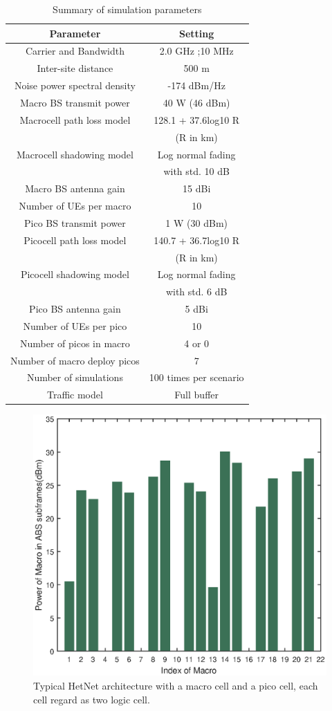 \documentclass[journal]{IEEETran}
\begin{document}
\begin{table}[!t]
\renewcommand{\arraystretch}{1.3}
\caption{Summary of simulation parameters}\label{T_SimulationParameters}
\centering
\begin{tabular}{c||c}
\hline
\bfseries Parameter & \bfseries Setting\\
\hline\hline
Carrier and Bandwidth &    2.0 GHz ;10 MHz\\
\hline
Inter-site distance  &    500 m\\
\hline
Noise power spectral density    &  -174 dBm/Hz\\
\hline
Macro BS transmit power&  40 W (46 dBm)\\
\hline
Macrocell path loss model&    128.1 + 37.6log10 R \\
&(R in km)\\
\hline
Macrocell shadowing model&    Log normal fading \\
&with std. 10 dB\\
\hline
Macro BS antenna gain   &   15 dBi\\
\hline
Number of UEs per macro & 10\\
\hline
Pico BS transmit power    &  1 W (30 dBm)\\
\hline
Picocell path loss model   &   140.7 + 36.7log10 R \\
&(R in km)\\
\hline
Picocell shadowing model &   Log normal fading\\
&with std. 6 dB\\
\hline
Pico BS antenna gain &  5 dBi\\
\hline
Number of UEs per pico  &    10\\
\hline
Number of picos in macro  &    4 or 0\\
\hline
Number of macro deploy picos  &    7\\
\hline
Number of simulations &    100 times per scenario \\
\hline
Traffic model  &   Full buffer \\
\hline
\end{tabular}
\end{table}

\begin{figure}[htpb]
\centering
\includegraphics[width=.5\textwidth]{PowerOfMacro.eps}
\caption{Typical HetNet architecture with a macro cell and a pico cell, each cell regard as two logic cell.}
\label{F_PowerOfMacro}
\end{figure}
\end{document}
